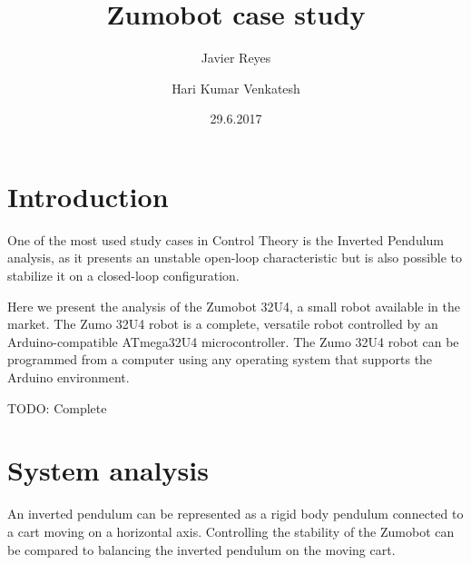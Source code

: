 \documentclass{article}
\title{Zumobot case study}
\date{29.6.2017}
\author{Javier Reyes \and Hari Kumar Venkatesh}
\begin{document}
\maketitle
{}
\newpage
{}

\tableofcontents
\newpage

\section*{Introduction}

One of the most used study cases in Control Theory is the Inverted Pendulum analysis, as it presents an unstable open-loop characteristic but is also possible to stabilize it on a closed-loop configuration.

Here we present the analysis of the Zumobot 32U4, a small robot available in the market. The Zumo 32U4 robot is a complete, versatile robot controlled by an Arduino-compatible ATmega32U4 microcontroller. The Zumo 32U4 robot can be programmed from a computer using any operating system that supports the Arduino environment.

TODO: Complete

\section{System analysis}

An inverted pendulum can be represented as a rigid body pendulum connected to a cart moving on a horizontal axis. Controlling the stability of the Zumobot can be compared to balancing the inverted pendulum on the moving cart.

\end{document}
